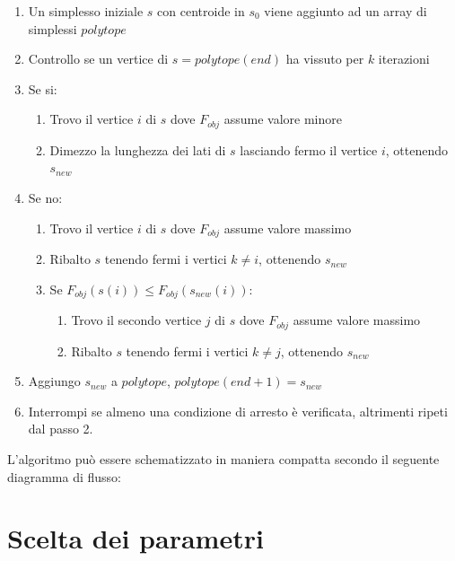 \documentclass[a4paper, 11pt]{article}
\begin{document}
\begin{enumerate}
\item Un simplesso iniziale $s$ con centroide in $s_{0}$ viene aggiunto ad un
array di simplessi $polytope$
\item Controllo se un vertice di $s = polytope(end)$ ha vissuto per $k$ iterazioni
\item Se si:
\begin{enumerate}
\item Trovo il vertice $i$ di $s$ dove $F_{obj}$ assume valore minore
\item Dimezzo la lunghezza dei lati di $s$ lasciando fermo il vertice $i$,
ottenendo $s_{new}$
\end{enumerate}
\item Se no:
\begin{enumerate}
\item Trovo il vertice $i$ di $s$ dove $F_{obj}$ assume valore massimo
\item Ribalto $s$ tenendo fermi i vertici $k \ne i$, ottenendo $s_{new}$
\item Se $F_{obj}(s(i)) \leq F_{obj}(s_{new}(i))$:
\begin{enumerate}
\item Trovo il secondo vertice $j$ di $s$ dove $F_{obj}$ assume valore massimo
\item Ribalto $s$ tenendo fermi i vertici $k \ne j$, ottenendo $s_{new}$
\end{enumerate}
\end{enumerate}
\item Aggiungo $s_{new}$ a $polytope$, $polytope(end+1) = s_{new}$
\item Interrompi se almeno una condizione di arresto è verificata, altrimenti
ripeti dal passo 2.
\end{enumerate}

\noindent
L'algoritmo può essere schematizzato in maniera compatta secondo il seguente
diagramma di flusso:


\section*{Scelta dei parametri}
\end{document}
